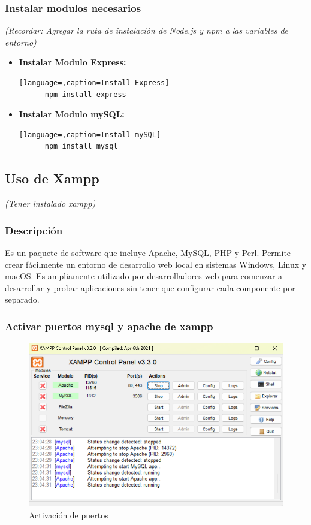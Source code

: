 \documentclass{article}
\begin{document}

  \subsubsection{Instalar modulos necesarios}
  \textit{(Recordar: Agregar la ruta de instalación de Node.js y npm a las variables de entorno)}
  \begin{itemize}
    \item \textbf{Instalar Modulo Express:}
    \begin{lstlisting}[language=,caption=Install Express]
      npm install express
    \end{lstlisting}
    \item \textbf{Instalar Modulo mySQL:}
    \begin{lstlisting}[language=,caption=Install mySQL]
      npm install mysql
    \end{lstlisting}
  \end{itemize}


  \subsection{Uso de Xampp}
  \textit{(Tener instalado xampp)}
  

  \subsubsection{Descripción}
    Es un paquete de software que incluye Apache, MySQL, PHP y Perl. Permite crear fácilmente un entorno 
    de desarrollo web local en sistemas Windows, Linux y macOS. Es ampliamente utilizado por desarrolladores 
    web para comenzar a desarrollar y probar aplicaciones sin tener que configurar cada componente por separado.
  \newpage
  

  \subsubsection{Activar puertos mysql y apache de xampp}
  \begin{figure}[H]
    \centering
    \includegraphics[width=1\textwidth, keepaspectratio]{img/puertos.png}
    \caption{Activación de puertos}
  \end{figure}
  
\end{document}
